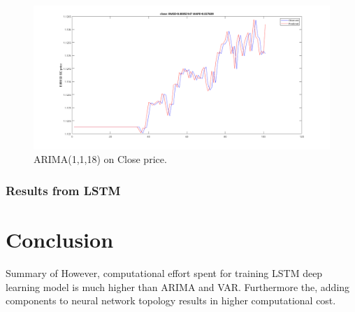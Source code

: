\documentclass[11pt]{article}
\begin{document}
\begin{figure}[H]
  \centering
  \includegraphics[width=\linewidth,keepaspectratio]{figs/var20close100.png}
  \caption{ARIMA(1,1,18) on Close price.}
\end{figure}

\subsubsection{Results from LSTM}
\section{Conclusion}
Summary of 
However, computational effort spent for training LSTM deep learning model is
much higher than ARIMA and VAR. Furthermore the, adding components to neural network
topology results in higher computational cost. 

\pagebreak


\end{document}
